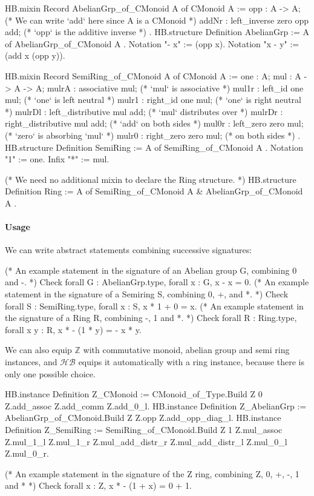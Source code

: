 \documentclass{easychair}
\newcommand{\HB}{\ensuremath{\mathcal{HB}}}
\begin{document}
\begin{coqcode}
HB.mixin Record AbelianGrp_of_CMonoid A of CMonoid A := {
  opp   : A -> A;
  (* We can write `add` here since A is a  CMonoid   *)
  addNr : left_inverse zero opp add; (* `opp` is the additive inverse *)
}.
HB.structure Definition AbelianGrp := { A of AbelianGrp_of_CMonoid A }.
Notation "- x"   := (opp x).
Notation "x - y" := (add x (opp y)).

HB.mixin Record SemiRing_of_CMonoid A of CMonoid A := {
  one    : A;
  mul    : A -> A -> A;
  mulrA  : associative mul;  (* `mul` is associative   *)
  mul1r  : left_id one mul;  (* `one` is left neutral  *)
  mulr1  : right_id one mul; (* `one` is right neutral *)
  mulrDl : left_distributive mul add;  (* `mul` distributes over *)
  mulrDr : right_distributive mul add; (*   `add` on both sides  *)
  mul0r  : left_zero zero mul;  (* `zero` is absorbing `mul`     *)
  mulr0  : right_zero zero mul; (*   on both sides               *)
}.
HB.structure Definition SemiRing := { A of SemiRing_of_CMonoid A }.
Notation "1"  := one.
Infix    "*"  := mul.

(* We need no additional mixin to declare the Ring structure. *)
HB.structure Definition Ring := { A of SemiRing_of_CMonoid A & AbelianGrp_of_CMonoid A }.
\end{coqcode}

\paragraph{Usage} We can write abstract statements combining successive signatures:
\begin{coqcode}
(* An example statement in the signature of an Abelian group G, combining 0 and -. *)
Check forall G : AbelianGrp.type, forall x : G, x - x = 0.
(* An example statement in the signature of a Semiring S, combining 0, +, and *.  *)
Check forall S : SemiRing.type, forall x : S, x * 1 + 0 = x.
(* An example statement in the signature of a Ring R, combining -, 1 and *.  *)
Check forall R : Ring.type, forall x y : R, x * - (1 * y) = - x * y.
\end{coqcode}

We can also equip $\mathbb{Z}$ with commutative monoid, abelian group
and semi ring instances, and \HB{} equips it automatically with a ring
instance, because there is only one possible choice.

\begin{coqcode}
HB.instance Definition Z_CMonoid    := CMonoid_of_Type.Build Z 0%
  Z.add_assoc Z.add_comm Z.add_0_l.
HB.instance Definition Z_AbelianGrp := AbelianGrp_of_CMonoid.Build Z Z.opp Z.add_opp_diag_l.
HB.instance Definition Z_SemiRing   := SemiRing_of_CMonoid.Build Z 1%
  Z.mul_assoc Z.mul_1_l Z.mul_1_r Z.mul_add_distr_r Z.mul_add_distr_l Z.mul_0_l Z.mul_0_r.

(* An example statement in the signature of the Z ring, combining Z, 0, +, -, 1 and * *)
Check forall x : Z, x * - (1 + x) = 0 + 1.
\end{coqcode}
\end{document}
